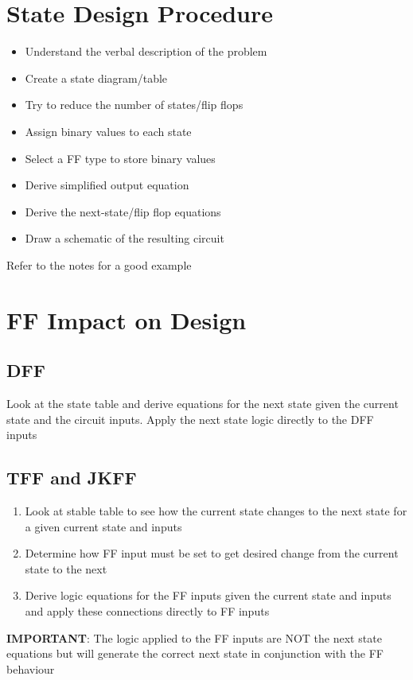 \documentclass[12pt]{report}
\begin{document}
	\section{State Design Procedure}
		\begin{itemize}
			\item Understand the verbal description of the problem
			\item Create a state diagram/table
			\item Try to reduce the number of states/flip flops
			\item Assign binary values to each state
			\item Select a FF type to store binary values
			\item Derive simplified output equation
			\item Derive the next-state/flip flop equations
			\item Draw a schematic of the resulting circuit
		\end{itemize}
		Refer to the notes for a good example
	\section{FF Impact on Design}
		\subsection{DFF}
			Look at the state table and derive equations for the next state given the current state and the circuit inputs. Apply the next state logic directly to the DFF inputs
		\subsection{TFF and JKFF}
			\begin{enumerate}
				\item Look at stable table to see how the current state changes to the next state for a given current state and inputs
				\item Determine how FF input must be set to get desired change from the current state to the next
				\item Derive logic equations for the FF inputs given the current state and inputs and apply these connections directly to FF inputs
			\end{enumerate}
			\textbf{IMPORTANT}: The logic applied to the FF inputs are NOT the next state equations but will generate the correct next state in conjunction with the FF behaviour
\end{document}
